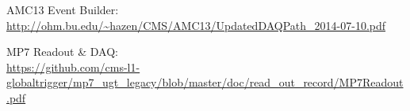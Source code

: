 \documentclass[11pt,a4paper,english,titlepage]{article}
\begin{document}
    \doctitlepage{}


    

% 

    \clearpage

    \begin{thebibliography}{00}

    AMC13 Event Builder:\\
    \url{http://ohm.bu.edu/~hazen/CMS/AMC13/UpdatedDAQPath_2014-07-10.pdf}

    MP7 Readout \& DAQ:\\
    \url{https://github.com/cms-l1-globaltrigger/mp7_ugt_legacy/blob/master/doc/read_out_record/MP7Readout.pdf}

    \end{thebibliography}

\end{document}
